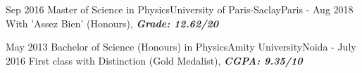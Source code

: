 \vspace*{-10px} 

\begin{academics}
  \academic
    {Sep 2016}   {Master of Science in Physics}{University of Paris-Saclay}{Paris}
    {- Aug 2018} {With 'Assez Bien' (Honours), \textbf{\textit{Grade: 12.62/20}}}
\end{academics}
\vspace*{-2.5ex} 
\begin{academics}
    \academic
   {May 2013}   {Bachelor of Science (Honours) in Physics}{Amity University}{Noida}
    {- July 2016} {First class with Distinction (Gold Medalist), \textbf{\textit{CGPA: 9.35/10}}}
\end{academics}
